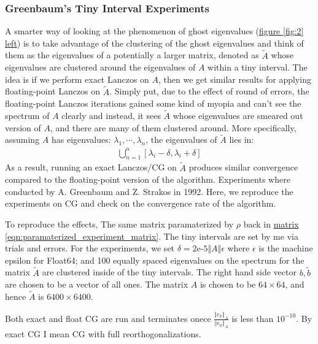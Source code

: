 \documentclass[]{article}
\theoremstyle{definition}
\begin{document}
    \subsubsection{Greenbaum's Tiny Interval Experiments}
        A smarter way of looking at the phenomenon of ghost eigenvalues (\hyperref[fig:2]{figure \ref*{fig:2} left}) is to take advantage of the clustering of the ghost eigenvalues and think of them as the eigenvalues of a potentially a larger matrix, denoted as $\tilde{A}$ whose eigenvalues are clustered around the eigenvalues of $A$ within a tiny interval. The idea is if we perform exact Lanczos on $A$, then we get similar results for applying floating-point Lanczos on $\tilde{A}$. Simply put, due to the effect of round of errors, the floating-point Lanczos iterations gained some kind of myopia and can't see the spectrum of $A$ clearly and instead, it sees $\tilde{A}$ whose eigenvalues are smeared out version of $A$, and there are many of them clustered around. More specifically, assuming $A$ has eigenvalues: $\lambda_1, \cdots, \lambda_n$, the eigenvalues of $\tilde{A}$ lies in: 
        \begin{align}
            \bigcup_{n = 1}^n[\lambda_i - \delta, \lambda_i + \delta]
        \end{align}
        As a result, running an exact Lanczos/CG on $\tilde{A}$ produces similar convergence compared to the floating-point version of the algorithm. Experiments where conducted by A. Greenbaum and Z. Strakos in 1992\cite{paper:greenbaum_tiny_interval_experiments}. Here, we reproduce the experiments on CG and check on the convergence rate of the algorithm. 
        \par
        To reproduce the effects, The same matrix paramaterized by $\rho$ back in \hyperref[eqn:paramaterized_experiment_matrix]{matrix \ref*{eqn:paramaterized_experiment_matrix}}. The tiny intervals are set by me via trials and errors. For the experiments, we set $\delta = \text{2e-5}\Vert A\Vert \epsilon$ where $\epsilon$ is the machine epsilon for Float64; and 100 equally spaced eigenvalues on the spectrum for the matrix $\tilde A$ are clustered inside of the tiny intervals. The right hand side vector $b,\tilde b$ are chosen to be a vector of all ones. The matrix $A$ is chosen to be $64 \times 64$, and hence $\tilde A$ is $6400 \times 6400$. 
        \par
        Both exact and float CG are run and terminates onece $\frac{\Vert e_k\Vert_A}{\Vert e_0\Vert_A}$ is less than $10^{-10}$. By exact CG I mean CG with full reorthogonalizations. 
\end{document}
